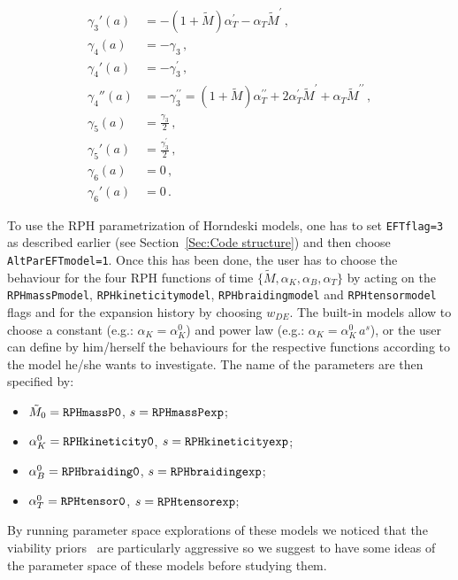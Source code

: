 \documentclass[prd,nofootinbib,showpacs]{revtex4}
\def\f{\frac}
\begin{document}
{\begin{align}
\gamma_3'(a) &= -(1+ \tilde{M})\alpha_T^\prime- \alpha_T \tilde{M}^\prime\,,  \nonumber \\
\gamma_4(a) &= -\gamma_3\,,  \nonumber \\
\gamma_4'(a) &= -\gamma_3^\prime\,,  \nonumber \\
\gamma_4''(a) &= -\gamma_3^{\prime\prime}= (1+ \tilde{M})\alpha_T^{\prime\prime}+2\alpha_T^\prime \tilde{M}^\prime + \alpha_T \tilde{M}^{\prime\prime} \,,  \nonumber \\
\gamma_5(a) &= \f{\gamma_3}{2} \,,  \nonumber \\
\gamma_5'(a) &=  \f{\gamma_3^\prime}{2}\,, \nonumber \\
\gamma_6(a) &= 0\,,  \nonumber \\
\gamma_6'(a) &=0 \,.
\end{align}

To use the  RPH  parametrization of Horndeski models, one has to set \verb|EFTflag=3| as described earlier (see Section~\ref{Sec:Code structure}) and then choose \verb|AltParEFTmodel=1|. Once this has been done, the user has to choose the behaviour for the four RPH functions of time $\{\tilde{M},\alpha_K,\alpha_B,\alpha_T\}$  by acting on the \verb|RPHmassPmodel|, \verb|RPHkineticitymodel|, \verb|RPHbraidingmodel| and \verb|RPHtensormodel| flags and for the expansion history by choosing $w_{DE}$. The built-in models allow to choose a constant (e.g.: $\alpha_K=\alpha_K^0$) and power law (e.g.: $\alpha_K = \alpha_K^0\, a^s$), or the  user can define by him/herself the behaviours for the respective functions according to the model he/she wants to investigate. The name of the parameters are then specified by:
%
\begin{itemize}
\item $\tilde{M}_0 = \verb|RPHmassP0|$, $s = \verb|RPHmassPexp|$;
\item $\alpha_{K}^0 = \verb|RPHkineticity0|$, $s = \verb|RPHkineticityexp|$;
\item $\alpha_{B}^0 = \verb|RPHbraiding0|$, $s = \verb|RPHbraidingexp|$;
\item $\alpha_{T}^0 = \verb|RPHtensor0|$, $s = \verb|RPHtensorexp|$;
\end{itemize}
%
By running parameter space explorations of these models we noticed that the viability priors~\cite{Bellini:2014fua} are particularly aggressive so we suggest to have some ideas of the parameter space of these models before studying them.

}
\end{document}
